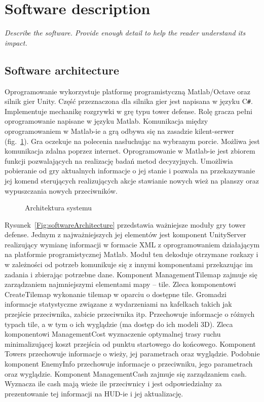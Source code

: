 
\section{Software description}

\textit{Describe the software. Provide enough detail to help the reader understand its impact. }

\subsection{Software architecture}

Oprogramowanie \SoftwareName wykorzystuje platformę programistyczną Matlab/Octave oraz silnik gier Unity. Część przeznaczona  dla silnika gier jest napisana w języku C\verb|#|. Implementuje mechanikę rozgrywki w grę typu tower defense. Rolę gracza pełni oprogramowanie napisane w języku Matlab. Komunikacja między oprogramowaniem w Matlab-ie a grą odbywa się na zasadzie kilent-serwer  (fig.~\ref{Fig:architecture}). Gra oczekuje na polecenia nasłuchując na wybranym porcie. Możliwa jest komunikacja zdalna poprzez internet. Oprogramowanie w Matlab-ie  jest zbiorem funkcji pozwalających na realizację badań metod decyzyjnych. Umożliwia pobieranie od gry aktualnych informacje o jej stanie i pozwala na  przekazywanie jej komend sterujących realizujących akcje stawianie nowych wież na planszy oraz wypuszczania nowych przeciwników. 

\begin{figure}

\caption{Architektura systemu}
\label{Fig:architecture}
\end{figure}

Rysunek~\ref{Fig:softwareArchitecture} przedstawia ważniejsze moduły gry tower defense. Jednym z najważniejszych jej elementów jest komponent UnityServer realizujący wymianę informacji w formacie XML z oprogramowaniem działającym na platformie programistycznej Matlab. Moduł ten dekoduje otrzymane rozkazy i w zależności od potrzeb komunikuje się z innymi komponentami przekazując im zadania i zbierając potrzebne dane. Komponent ManagementTilemap zajmuje się zarządzaniem najmniejszymi elementami mapy -- tile. Zleca komponentowi CreateTilemap wykonanie tilemap w oparciu o dostępne tile. Gromadzi informacje statystyczne związane z wydarzeniami na kafelkach takich jak przejście  przeciwnika, zabicie przeciwnika itp. Przechowuje informacje o różnych typach tile, a w tym o ich wyglądzie (ma dostęp do ich modeli 3D). Zleca komponentowi ManagementCost wyznaczenie optymalnej trasy ruchu minimalizującej koszt przejścia od punktu startowego do końcowego. Komponent Towers przechowuje informacje o wieży, jej parametrach oraz wyglądzie. Podobnie komponent EnemyInfo przechowuje informacje o przeciwniku, jego parametrach oraz wyglądzie. Komponent ManagementCash zajmuje się zarządzaniem cash. Wyznacza ile cash mają wieże ile przeciwnicy i jest odpowiedzialny za prezentowanie tej informacji na HUD-ie i jej aktualizację.  

